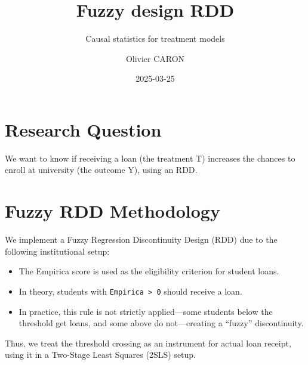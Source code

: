 \documentclass[
  6pt,
]{article}
\title{Fuzzy design RDD}
\subtitle{Causal statistics for treatment models}
\author{Olivier CARON}
\date{2025-03-25}
\providecommand{\tightlist}{%
  \setlength{\itemsep}{0pt}\setlength{\parskip}{0pt}}\usepackage{longtable,booktabs,array}
\renewcommand*\contentsname{Table of contents}
\newcommand\contentsname{Table of contents}
\begin{document}
\maketitle

\renewcommand*\contentsname{Table of contents}
{
\hypersetup{linkcolor=}
\setcounter{tocdepth}{3}
\tableofcontents
}

\newpage

\section{Research Question}\label{research-question}

\begin{tcolorbox}[enhanced jigsaw, opacitybacktitle=0.6, toptitle=1mm, colback=white, bottomtitle=1mm, colbacktitle=quarto-callout-note-color!10!white, bottomrule=.15mm, arc=.35mm, colframe=quarto-callout-note-color-frame, breakable, titlerule=0mm, opacityback=0, coltitle=black, leftrule=.75mm, left=2mm, rightrule=.15mm, toprule=.15mm, title=\textcolor{quarto-callout-note-color}{\faInfo}\hspace{0.5em}{Research Question}]

We want to know if receiving a loan (the treatment T) increases the
chances to enroll at university (the outcome Y), using an RDD.

\end{tcolorbox}

\section{Fuzzy RDD Methodology}\label{fuzzy-rdd-methodology}

We implement a Fuzzy Regression Discontinuity Design (RDD) due to the
following institutional setup:

\begin{itemize}
\tightlist
\item
  The Empirica score is used as the eligibility criterion for student
  loans.
\item
  In theory, students with \texttt{Empirica\ \textgreater{}\ 0} should
  receive a loan.
\item
  In practice, this rule is not strictly applied---some students below
  the threshold get loans, and some above do not---creating a ``fuzzy''
  discontinuity.
\end{itemize}

Thus, we treat the threshold crossing as an instrument for actual loan
receipt, using it in a Two-Stage Least Squares (2SLS) setup.
\end{document}
